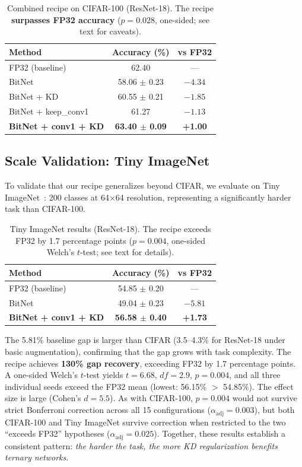 \documentclass[10pt]{article}
\begin{document}
\begin{table}[h]
\centering
\caption{Combined recipe on CIFAR-100 (ResNet-18). The recipe \textbf{surpasses FP32 accuracy} ($p=0.028$, one-sided; see text for caveats).}
\label{tab:recipe_cifar100}
\begin{tabular}{lcc}
\toprule
Method & Accuracy (\%) & vs FP32 \\
\midrule
FP32 (baseline) & 62.40 & --- \\
\midrule
BitNet & 58.06 $\pm$ 0.23 & $-4.34$ \\
BitNet + KD & 60.55 $\pm$ 0.21 & $-1.85$ \\
BitNet + keep\_conv1 & 61.27 & $-1.13$ \\
\textbf{BitNet + conv1 + KD} & \textbf{63.40 $\pm$ 0.09} & \textbf{+1.00} \\
\bottomrule
\end{tabular}
\end{table}

\subsection{Scale Validation: Tiny ImageNet}

To validate that our recipe generalizes beyond CIFAR, we evaluate on Tiny ImageNet~\cite{le2015tinyimagenet}: 200 classes at 64$\times$64 resolution, representing a significantly harder task than CIFAR-100.

\begin{table}[ht]
\centering
\caption{Tiny ImageNet results (ResNet-18). The recipe exceeds FP32 by 1.7 percentage points ($p=0.004$, one-sided Welch's $t$-test; see text for details).}
\label{tab:tinyimagenet}
\begin{tabular}{lcc}
\toprule
Method & Accuracy (\%) & vs FP32 \\
\midrule
FP32 (baseline) & 54.85 $\pm$ 0.20 & --- \\
\midrule
BitNet & 49.04 $\pm$ 0.23 & $-5.81$ \\
\textbf{BitNet + conv1 + KD} & \textbf{56.58 $\pm$ 0.40} & \textbf{+1.73} \\
\bottomrule
\end{tabular}
\end{table}

The 5.81\% baseline gap is larger than CIFAR (3.5--4.3\% for ResNet-18 under basic augmentation), confirming that the gap grows with task complexity. The recipe achieves \textbf{130\% gap recovery}, exceeding FP32 by 1.7 percentage points. A one-sided Welch's $t$-test yields $t=6.68$, $df=2.9$, $p=0.004$, and all three individual seeds exceed the FP32 mean (lowest: 56.15\% $>$ 54.85\%). The effect size is large (Cohen's $d=5.5$). As with CIFAR-100, $p=0.004$ would not survive strict Bonferroni correction across all 15 configurations ($\alpha_{\text{adj}}=0.003$), but both CIFAR-100 and Tiny ImageNet survive correction when restricted to the two ``exceeds FP32'' hypotheses ($\alpha_{\text{adj}}=0.025$). Together, these results establish a consistent pattern: \emph{the harder the task, the more KD regularization benefits ternary networks}.
\end{document}
